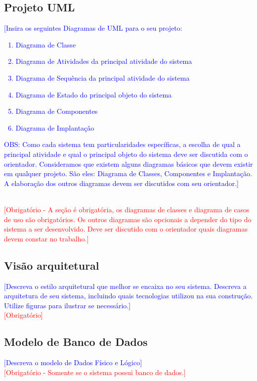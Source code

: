 \documentclass[10pt]{relatorio_tcc_ads_ifba}
\begin{document}
\subsection{Projeto UML}
\textcolor{blue}{
    [Insira os seguintes Diagramas de UML para o seu projeto: 
    \begin{enumerate}
        \item Diagrama de Classe
        \item Diagrama de Atividades da principal atividade do sistema
        \item Diagrama de Sequência da principal atividade do sistema
        \item Diagrama de Estado do principal objeto do sistema
        \item Diagrama de Componentes
        \item Diagrama de Implantação
    \end{enumerate}
    OBS: Como cada sistema tem particularidades específicas, a escolha de qual a principal atividade e qual o principal objeto do sistema deve ser discutida com o orientador. Consideramos que existem alguns diagramas básicos que devem existir em qualquer projeto. São eles: Diagrama de Classes, Componentes e Implantação. A elaboração dos outros diagramas devem ser discutidos com seu orientador.]
} \\
\textcolor{red}{
    [Obrigatório - A seção é obrigatória, os diagramas de classes e diagrama de casos de uso são obrigatórios. Os outros diagramas são opcionais a depender do tipo do sistema a ser desenvolvido. Deve ser discutido com o orientador quais diagramas devem constar no trabalho.]
}

\subsection{Visão arquitetural}
\textcolor{blue}{
    [Descreva o estilo arquitetural que melhor se encaixa no seu sistema. Descreva a arquitetura de seu sistema, incluindo quais tecnologias utilizou na sua construção. Utilize figuras para ilustrar se necessário.]
} \\
\textcolor{red}{[Obrigatório]}

\subsection{Modelo de Banco de Dados}
\textcolor{blue}{
    [Descreva o modelo de Dados Físico e Lógico]
} \\
\textcolor{red}{
    [Obrigatório - Somente se o sistema possui banco de dados.]
}
\end{document}
